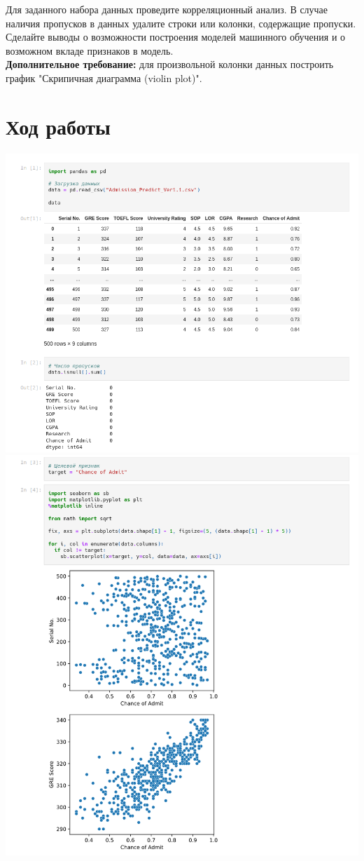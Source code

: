 \documentclass[a4paper]{article}
\begin{document}
  Для заданного набора данных проведите корреляционный анализ.
  В случае наличия пропусков в данных удалите строки или колонки, содержащие пропуски.
  Сделайте выводы о возможности построения моделей машинного обучения и о возможном вкладе признаков в модель. \\
  \textbf{Дополнительное требование:} для произвольной колонки данных построить график "Скрипичная диаграмма (violin plot)".

  \section*{Ход работы}
  \includegraphics[scale=0.4]{11}
  \includegraphics[scale=0.4]{22}
\end{document}
